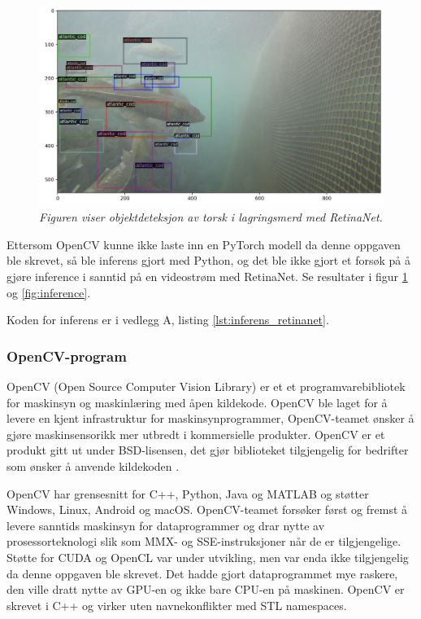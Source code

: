 \begin{figure}
\begin{center} 
\includegraphics[scale=0.35]{figures/retinanet_cod}
\caption{\small \sl Figuren viser objektdeteksjon av torsk i lagringsmerd med RetinaNet. \label{fig:retinenet_inference}} 
\end{center} 
\end{figure} 

Ettersom OpenCV kunne ikke laste inn en PyTorch modell da denne oppgaven ble skrevet, så ble inferens gjort med Python, og det ble ikke gjort et forsøk på å gjøre inference i sanntid på en videostrøm med RetinaNet. Se resultater i figur \ref{fig:retinenet_inference} og \ref{fig:inference}.

Koden for inferens er i vedlegg A, listing \ref{lst:inferens_retinanet}.

\subsubsection{OpenCV-program} \label{part:opencv}

OpenCV (Open Source Computer Vision Library) er et et programvarebibliotek for maskinsyn og maskinlæring med åpen kildekode. OpenCV ble laget for å levere en kjent infrastruktur for maskinsynprogrammer, OpenCV-teamet ønsker å gjøre maskinsensorikk mer utbredt i kommersielle produkter. OpenCV er et produkt gitt ut under BSD-lisensen, det gjør biblioteket tilgjengelig for bedrifter som ønsker å anvende kildekoden \cite{OpenCV Team 2020}.

OpenCV har grensesnitt for C++, Python, Java og MATLAB og støtter Windows, Linux, Android og macOS. OpenCV-teamet forsøker først og fremst å levere sanntids maskinsyn for dataprogrammer og drar nytte av prosessorteknologi slik som MMX- og SSE-instruksjoner når de er tilgjengelige. Støtte for CUDA og OpenCL var under utvikling, men var enda ikke tilgjengelig da denne oppgaven ble skrevet. Det hadde gjort dataprogrammet mye raskere, den ville dratt nytte av GPU-en og ikke bare CPU-en på maskinen. OpenCV er skrevet i C++ og virker uten navnekonflikter med STL namespaces. \cite{OpenCV Team 2020}

